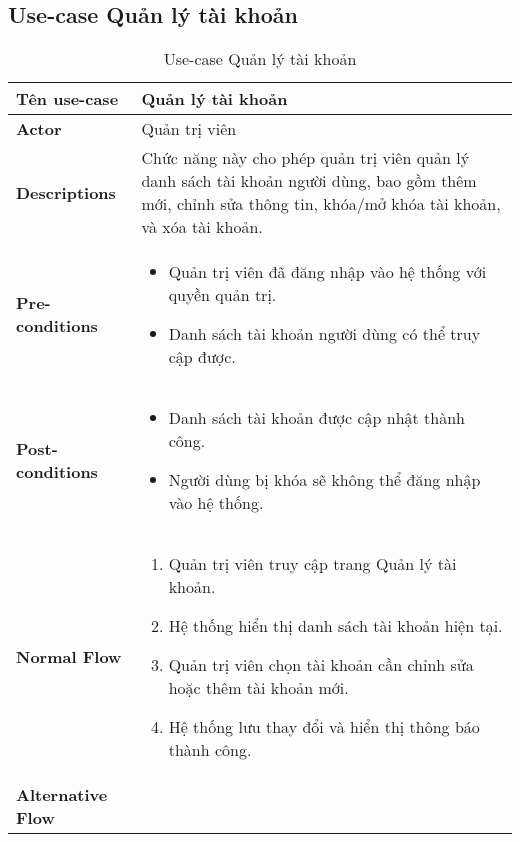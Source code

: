 \subsection{Use-case Quản lý tài khoản}
\begin{longtable}[H]{|l|p{}|}
    \caption{Use-case Quản lý tài khoản} \\
    \hline
    \textbf{Tên use-case} & Quản lý tài khoản \\
    \hline
    \textbf{Actor} & Quản trị viên \\
    \hline
    \textbf{Descriptions} & Chức năng này cho phép quản trị viên quản lý danh sách tài khoản người dùng, bao gồm thêm mới, chỉnh sửa thông tin, khóa/mở khóa tài khoản, và xóa tài khoản. \\
    \hline
    \textbf{Pre-conditions} & \vspace{-0.75cm}
    \begin{itemize}[leftmargin=4mm]
        \item Quản trị viên đã đăng nhập vào hệ thống với quyền quản trị.
        \item Danh sách tài khoản người dùng có thể truy cập được.
    \end{itemize} \\
    \hline
    \textbf{Post-conditions} & \vspace{-0.75cm}
    \begin{itemize}[leftmargin=4mm]
        \item Danh sách tài khoản được cập nhật thành công.
        \item Người dùng bị khóa sẽ không thể đăng nhập vào hệ thống.
    \end{itemize} \\
    \hline
    \textbf{Normal Flow} &  \vspace{-0.75cm}
    \begin{enumerate}[leftmargin=5.5mm]
        \item Quản trị viên truy cập trang Quản lý tài khoản.
        \item Hệ thống hiển thị danh sách tài khoản hiện tại.
        \item Quản trị viên chọn tài khoản cần chỉnh sửa hoặc thêm tài khoản mới.
        \item Hệ thống lưu thay đổi và hiển thị thông báo thành công.
    \end{enumerate} \\
    \hline
    \textbf{Alternative Flow} & \vspace{-0.75cm}
    \begin{itemize}[leftmargin=4mm]

\end{itemize}
\end{longtable}
